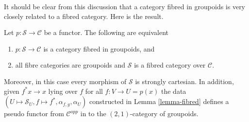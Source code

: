 \medskip\noindent
It should be clear from this discussion that a
category fibred in groupoids is very closely related
to a fibred category. Here is the result.

\begin{lemma}
\label{lemma-fibred-groupoids}
Let $p : \mathcal{S} \to \mathcal{C}$ be a functor.
The following are equivalent
\begin{enumerate}
\item $p : \mathcal{S} \to \mathcal{C}$ is a category
fibred in groupoids, and
\item all fibre categories are groupoids and
$\mathcal{S}$ is a fibred category over $\mathcal{C}$.
\end{enumerate}
Moreover, in this case every morphism of $\mathcal{S}$ is
strongly cartesian. In addition, given $f^\ast x \to x$
lying over $f$ for all $f: V \to U = p(x)$ the data
$(U \mapsto \mathcal{S}_U, f \mapsto f^*, \alpha_{f, g}, \alpha_U)$
constructed in Lemma \ref{lemma-fibred}
defines a pseudo functor from $\mathcal{C}^{opp}$ in to
the $(2, 1)$-category of groupoids.
\end{lemma}

